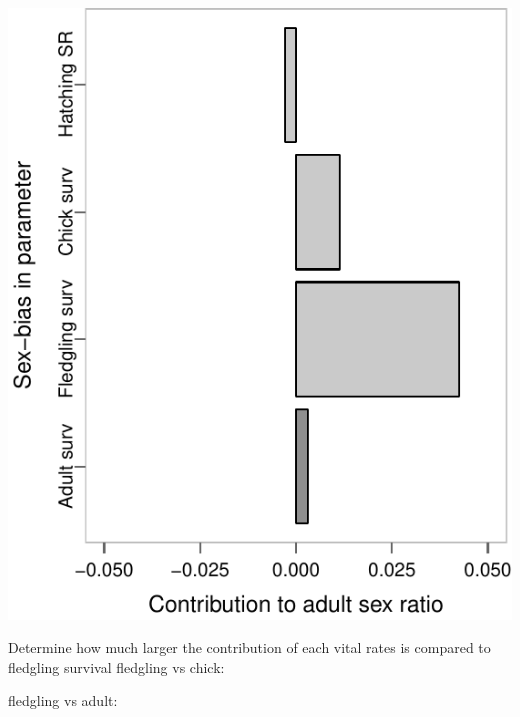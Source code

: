 \documentclass[]{article}
\newenvironment{Shaded}{\begin{snugshade}}{\end{snugshade}}
\newcommand{\DecValTok}[1]{\textcolor[rgb]{0.00,0.00,0.81}{{#1}}}
\newcommand{\CommentTok}[1]{\textcolor[rgb]{0.56,0.35,0.01}{\textit{{#1}}}}
\newcommand{\NormalTok}[1]{{#1}}
\begin{document}
\begin{center}\includegraphics{Ceuta_ASR_Matrix_Modeling_files/figure-latex/unnamed-chunk-69-1} \end{center}

Determine how much larger the contribution of each vital rates is
compared to fledgling survival fledgling vs chick:

\begin{Shaded}
\end{Shaded}

fledgling vs adult:

\begin{Shaded}
\end{Shaded}
\end{document}
